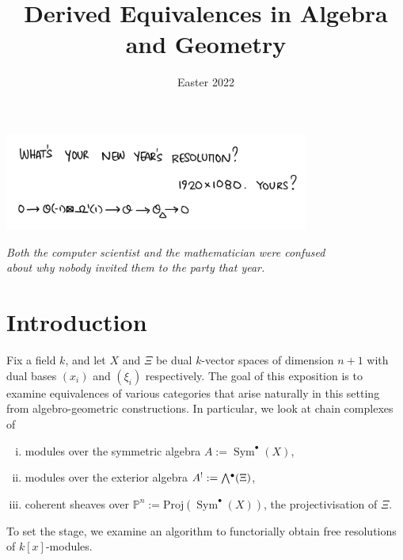 \documentclass[a4paper]{article}
\title{Derived Equivalences in Algebra and Geometry}
\date{\vspace{-2.5em} Easter 2022}
\theoremstyle{definition}
\theoremstyle{remark}
\newcommand{\Exter}{\mathchoice{{\textstyle\bigwedge}}%
    {{\bigwedge}}%
    {{\textstyle\wedge}}%
    {{\scriptstyle\wedge}}}
\DeclareMathOperator{\Sym}{\text{Sym}}
\DeclareMathOperator{\exterior}{\Exter^\bullet}
\newcommand{\Proj}{\ensuremath{\text{Proj}}}
\newcommand{\Pn}{\ensuremath{{\mathbb{P}^n}}}
\begin{document}
 


\maketitle
\vspace{5em}
\begin{center}
    \includegraphics[width=10cm]{Untitled_Artwork 3.png}
    
    \textit{Both the computer scientist and the mathematician were confused
    \\about why nobody invited them to the party that year.}
\end{center}
\vspace{5em}

\tableofcontents 
\pagebreak

\section*{Introduction}

Fix a field \(k\), and let \(X\) and \(\Xi\) be dual \(k\)-vector spaces of
dimension \(n+1\) with dual bases \((x_i)\) and \((\xi_i)\) respectively. The goal
of this exposition is to examine equivalences of various categories that arise
naturally in this setting from algebro-geometric constructions. In particular,
we look at chain complexes of 
\begin{enumerate}[(i)]
    \item modules over the symmetric algebra \(A:=
        \Sym^\bullet(X)\),
    \item modules over the exterior algebra \(A^!:= \exterior(\Xi)\),
    \item coherent sheaves over \(\Pn := \Proj(\Sym^\bullet (X))\), the
        projectivisation of \(\Xi\).
\end{enumerate}

To set the stage, we examine an algorithm to functorially obtain free
resolutions of \(k[x]\)-modules.
\end{document}
